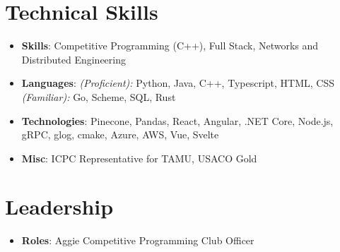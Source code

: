 \documentclass[letterpaper,10pt]{article}
\newcommand{\resumeItem}[2]{
  \item\small{
    \textbf{#1}{: #2 \vspace{-2pt}}
  }
}
\newcommand{\resumeSubItem}[2]{\resumeItem{#1}{#2}\vspace{-4pt}}
\newcommand{\resumeSubHeadingListStart}{\begin{itemize}[leftmargin=*]}
\newcommand{\resumeSubHeadingListEnd}{\end{itemize}}
\begin{document}
\section{Technical Skills}
  \resumeSubHeadingListStart
    \resumeSubItem{
      \textbf{Skills}} {Competitive Programming (C++), Full Stack, Networks and Distributed Engineering}
    \resumeSubItem{
      \textbf{Languages}} {\textit{(Proficient):} Python, Java, C++, Typescript, HTML, CSS \textit{(Familiar):} Go, Scheme, SQL, Rust}
    \resumeSubItem{
      \textbf{Technologies}}{Pinecone, Pandas, React, Angular, .NET Core, Node.js, gRPC, glog, cmake, Azure, AWS, Vue, Svelte}
     \resumeSubItem{
      \textbf{Misc}} {ICPC Representative for TAMU, USACO Gold}
  \resumeSubHeadingListEnd
\section{Leadership}
	\resumeSubHeadingListStart
		\resumeSubItem{\textbf{Roles}}{Aggie Competitive Programming Club Officer}
	\resumeSubHeadingListEnd

\end{document}

